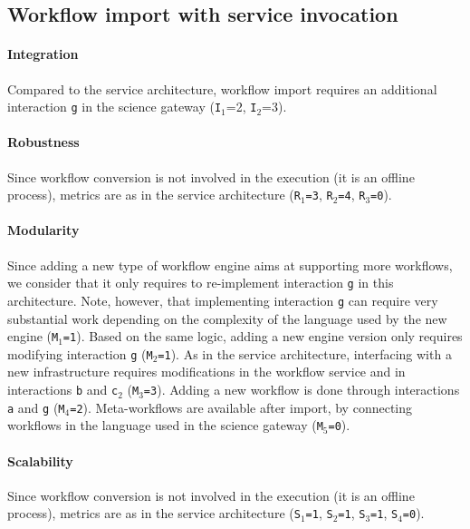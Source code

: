 \documentclass[preprint,3p,twocolumn]{elsarticle}
\begin{document}
\subsection{Workflow import with service invocation}

\paragraph{Integration} Compared to the service architecture, workflow
import requires an additional interaction \texttt{g} in the science
gateway (\texttt{I$_1$}=2, \texttt{I$_2$}=3).

\paragraph{Robustness} Since workflow conversion is not involved in
the execution (it is an offline process), metrics are as in the
service architecture (\texttt{R$_1$=3}, \texttt{R$_2$=4},
\texttt{R$_3$=0}).

\paragraph{Modularity} Since adding a new type of workflow engine aims
at supporting more workflows, we consider that it only requires to
re-implement interaction \texttt{g} in this architecture. Note,
however, that implementing interaction \texttt{g} can require very
substantial work depending on the complexity of the language used by
the new engine (\texttt{M$_1$=1}). Based on the same logic, adding a
new engine version only requires modifying interaction \texttt{g}
(\texttt{M$_2$=1}). As in the service architecture, interfacing with a
new infrastructure requires modifications in the workflow service and
in interactions \texttt{b} and \texttt{c$_2$}
(\texttt{M$_3$=3}). Adding a new workflow is done through interactions
\texttt{a} and \texttt{g} (\texttt{M$_4$=2}). Meta-workflows are
available after import, by connecting workflows in the language used
in the science gateway (\texttt{M$_5$=0}).

\paragraph{Scalability}  Since workflow conversion is not involved in
the execution (it is an offline process), metrics are as in the
service architecture (\texttt{S$_1$=1}, \texttt{S$_2$=1},
\texttt{S$_3$=1}, \texttt{S$_4$=0}).
\end{document}
